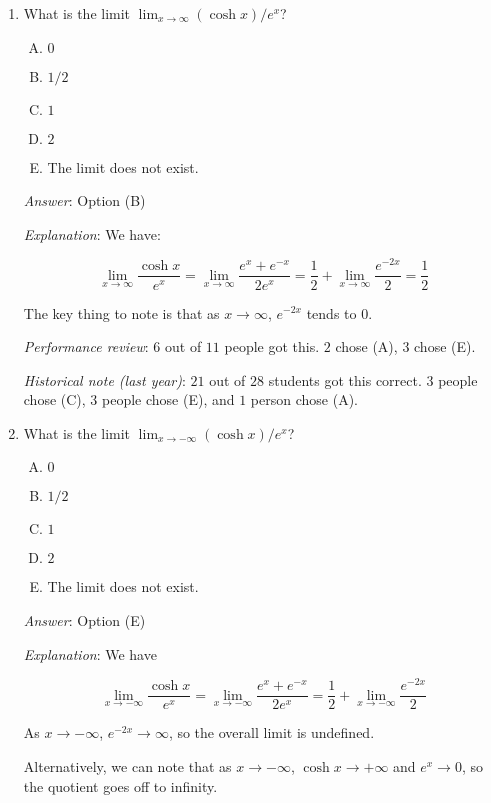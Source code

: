 \documentclass[10pt]{amsart}
\begin{document}
\begin{enumerate}
\item What is the limit $\lim_{x \to \infty} (\cosh x)/e^x$?

  \begin{enumerate}[(A)]
  \item $0$
  \item $1/2$
  \item $1$
  \item $2$
  \item The limit does not exist.
  \end{enumerate}

  {\em Answer}: Option (B)

  {\em Explanation}: We have:

  $$\lim_{x \to \infty} \frac{\cosh x}{e^x} = \lim_{x \to \infty} \frac{e^x + e^{-x}}{2e^x} = \frac{1}{2} + \lim_{x \to \infty} \frac{e^{-2x}}{2} = \frac{1}{2}$$

  The key thing to note is that as $x \to \infty$, $e^{-2x}$ tends to $0$.

  {\em Performance review}: $6$ out of $11$ people got this. $2$ chose
  (A), $3$ chose (E).

  {\em Historical note (last year)}: $21$ out of $28$ students got
  this correct. $3$ people chose (C), $3$ people chose (E), and $1$
  person chose (A).
\item What is the limit $\lim_{x \to -\infty} (\cosh x)/e^x$?

  \begin{enumerate}[(A)]
  \item $0$
  \item $1/2$
  \item $1$
  \item $2$
  \item The limit does not exist.
  \end{enumerate}

  {\em Answer}: Option (E)

  {\em Explanation}: We have

  $$\lim_{x \to -\infty} \frac{\cosh x}{e^x} = \lim_{x \to -\infty} \frac{e^x + e^{-x}}{2e^x} = \frac{1}{2} + \lim_{x \to -\infty} \frac{e^{-2x}}{2}$$

  As $x \to -\infty$, $e^{-2x} \to \infty$, so the overall limit is undefined.

  Alternatively, we can note that as $x \to -\infty$, $\cosh x \to
  +\infty$ and $e^x \to 0$, so the quotient goes off to infinity.


\end{enumerate}
\end{document}
